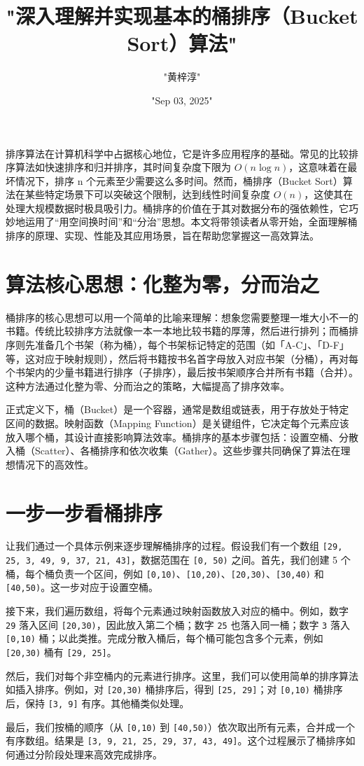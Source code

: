 \title{"深入理解并实现基本的桶排序（Bucket Sort）算法"}
\author{"黄梓淳"}
\date{"Sep 03, 2025"}
\maketitle
排序算法在计算机科学中占据核心地位，它是许多应用程序的基础。常见的比较排序算法如快速排序和归并排序，其时间复杂度下限为 $O(n\log{n})$，这意味着在最坏情况下，排序 n 个元素至少需要这么多时间。然而，桶排序（Bucket Sort）算法在某些特定场景下可以突破这个限制，达到线性时间复杂度 $O(n)$，这使其在处理大规模数据时极具吸引力。桶排序的价值在于其对数据分布的强依赖性，它巧妙地运用了“用空间换时间”和“分治”思想。本文将带领读者从零开始，全面理解桶排序的原理、实现、性能及其应用场景，旨在帮助您掌握这一高效算法。\par
\chapter{算法核心思想：化整为零，分而治之}
桶排序的核心思想可以用一个简单的比喻来理解：想象您需要整理一堆大小不一的书籍。传统比较排序方法就像一本一本地比较书籍的厚薄，然后进行排列；而桶排序则先准备几个书架（称为桶），每个书架标记特定的范围（如「A-C」、「D-F」等，这对应于映射规则），然后将书籍按书名首字母放入对应书架（分桶），再对每个书架内的少量书籍进行排序（子排序），最后按书架顺序合并所有书籍（合并）。这种方法通过化整为零、分而治之的策略，大幅提高了排序效率。\par
正式定义下，桶（Bucket）是一个容器，通常是数组或链表，用于存放处于特定区间的数据。映射函数（Mapping Function）是关键组件，它决定每个元素应该放入哪个桶，其设计直接影响算法效率。桶排序的基本步骤包括：设置空桶、分散入桶（Scatter）、各桶排序和依次收集（Gather）。这些步骤共同确保了算法在理想情况下的高效性。\par
\chapter{一步一步看桶排序}
让我们通过一个具体示例来逐步理解桶排序的过程。假设我们有一个数组 \texttt{[29, 25, 3, 49, 9, 37, 21, 43]}，数据范围在 \texttt{[0, 50)} 之间。首先，我们创建 5 个桶，每个桶负责一个区间，例如 \texttt{[0,10)}、\texttt{[10,20)}、\texttt{[20,30)}、\texttt{[30,40)} 和 \texttt{[40,50)}。这一步对应于设置空桶。\par
接下来，我们遍历数组，将每个元素通过映射函数放入对应的桶中。例如，数字 \texttt{29} 落入区间 \texttt{[20,30)}，因此放入第二个桶；数字 \texttt{25} 也落入同一桶；数字 \texttt{3} 落入 \texttt{[0,10)} 桶；以此类推。完成分散入桶后，每个桶可能包含多个元素，例如 \texttt{[20,30)} 桶有 \texttt{[29, 25]}。\par
然后，我们对每个非空桶内的元素进行排序。这里，我们可以使用简单的排序算法如插入排序。例如，对 \texttt{[20,30)} 桶排序后，得到 \texttt{[25, 29]}；对 \texttt{[0,10)} 桶排序后，保持 \texttt{[3, 9]} 有序。其他桶类似处理。\par
最后，我们按桶的顺序（从 \texttt{[0,10)} 到 \texttt{[40,50)}）依次取出所有元素，合并成一个有序数组。结果是 \texttt{[3, 9, 21, 25, 29, 37, 43, 49]}。这个过程展示了桶排序如何通过分阶段处理来高效完成排序。\par
